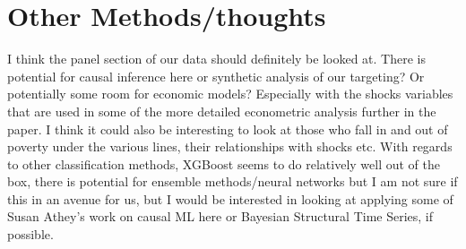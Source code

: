 \documentclass{article}
\begin{document}
\section{Other Methods/thoughts}
I think the panel section of our data should definitely be looked at. There is potential for causal inference here or synthetic analysis of our targeting? Or potentially some room for economic models? Especially with the shocks variables that are used in some of the more detailed econometric analysis further in the paper. I think it could also be interesting to look at those who fall in and out of poverty under the various lines, their relationships with shocks etc. With regards to other classification methods, XGBoost seems to do relatively well out of the box, there is potential for ensemble methods/neural networks but I am not sure if this in an avenue for us, but I would be interested in looking at applying some of Susan Athey's work on causal ML here or Bayesian Structural Time Series, if possible. 
\end{document}
